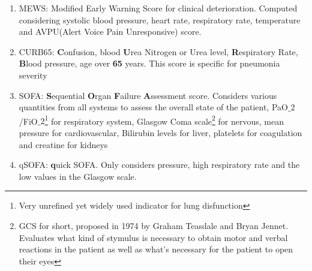 \begin{enumerate}
\begin{enumerate}
		\item MEWS: Modified Early Warning Score for clinical deterioration. Computed considering systolic blood pressure, heart rate, respiratory rate, temperature and AVPU(Alert Voice Pain Unresponsive) score. \cite{MEWS}
		\item CURB65: \textbf{C}onfusion, blood \textbf{U}rea Nitrogen or Urea level, \textbf{R}espiratory Rate, \textbf{B}lood pressure, age over \textbf{65} years. This score is specific for pneumonia severity \cite{CURB65}
		\item SOFA:  \textbf{S}equential  \textbf{O}rgan  \textbf{F}ailure  \textbf{A}ssessment score. Considers various quantities from all systems to assess the overall state of the patient, PaO$\_2$/FiO$\_2$\footnote{Very unrefined yet widely used indicator for lung disfunction} for respiratory system, Glasgow Coma scale\footnote{GCS for short, proposed in 1974 by Graham Teasdale and Bryan Jennet. Evaluates what kind of stymulus is necessary to obtain motor and verbal reactions in the patient as well as what's necessary for the patient to open their eyes} for nervous, mean pressure for cardiovascular, Bilirubin levels for liver, platelets for coagulation and creatine for kidneys \cite{SOFA}
		\item qSOFA:  \textbf{q}uick SOFA. Only considers pressure, high respiratory rate and the low values in the Glasgow scale.
	\end{enumerate}
\end{enumerate}

